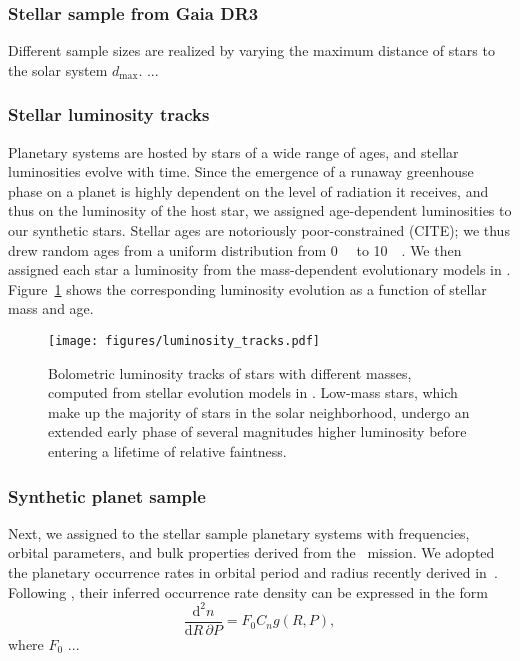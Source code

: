 \documentclass[twocolumn]{aastex631}
\begin{document}
\subsubsection{Stellar sample from Gaia DR3}
Different sample sizes are realized by varying the maximum distance of stars to the solar system $d_\mathrm{max}$.
...

\subsubsection{Stellar luminosity tracks}
    Planetary systems are hosted by stars of a wide range of ages, and stellar luminosities evolve with time.
    Since the emergence of a runaway greenhouse phase on a planet is highly dependent on the level of radiation it receives, and thus on the luminosity of the host star, we assigned age-dependent luminosities to our synthetic stars.
    Stellar ages are notoriously poor-constrained (CITE); we thus drew random ages from a uniform distribution from \SI{0}{\giga\year} to \SI{10}{\giga\year}.
    We then assigned each star a luminosity from the mass-dependent evolutionary models in \citet{Baraffe1998}.
    Figure~\ref{fig:luminosity_tracks} shows the corresponding luminosity evolution as a function of stellar mass and age.
\begin{figure}[ht!]
    \begin{centering}
        \texttt{[image: figures/luminosity\_tracks.pdf]}
        \caption{
            Bolometric luminosity tracks of stars with different masses, computed from stellar evolution models in \citet{Baraffe1998}.
            Low-mass stars, which make up the majority of stars in the solar neighborhood, undergo an extended early phase of several magnitudes higher luminosity before entering a lifetime of relative faintness.
        }
        \label{fig:luminosity_tracks}
    \end{centering}
\end{figure}


\subsubsection{Synthetic planet sample}\label{sec:syn_planets}
Next, we assigned to the stellar sample planetary systems with frequencies, orbital parameters, and bulk properties derived from the \kepler\ mission.
We adopted the planetary occurrence rates in orbital period and radius recently derived in~\citep{Bergsten2022}.
Following \citep{Youdin2011a}, their inferred occurrence rate density can be expressed in the form
\begin{equation}
    \frac{\mathrm{d}^2n}{\mathrm{d}R \, \partial P} = F_0 C_n g(R, P),
\end{equation}
where $F_0$
...
\end{document}
